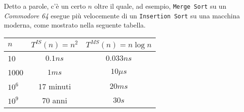 Detto a parole, c'è un certo $n$ oltre il quale, ad esempio, \texttt{Merge Sort} su un \emph{Commodore 64} 
esegue più velocemente di un \texttt{Insertion Sort} su una macchina moderna, come mostrato nella seguente 
tabella.
\begin{center}
	\begin{tabular}{l|c|c}
		$n$ & $T^{IS}(n)=n^2$ & $T^{MS}(n)=n \log n$ \\
		\hline
		10 & $0.1ns$ & $0.033ns$ \\
		\hline
		1000 & $1ms$ & $10\mu s$ \\
		\hline
		$10^6$ & 17 minuti & $20ms$ \\
		\hline
		$10^9$ & 70 anni & $30s$ \\
	\end{tabular}
\end{center}
